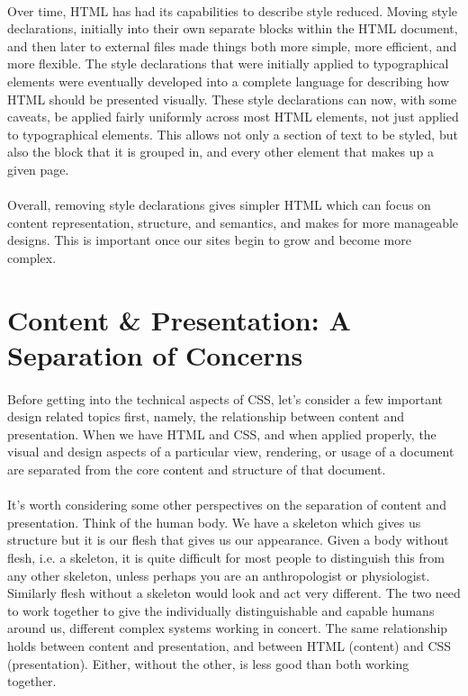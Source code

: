 \paragraph{} Over time, HTML has had its capabilities to describe style reduced. Moving style declarations, initially into their own separate blocks within the HTML document, and then later to external files made things both more simple, more efficient, and more flexible. The style declarations that were initially applied to typographical elements were eventually developed into a complete language for describing how HTML should be presented visually. These style declarations can now, with some caveats, be applied fairly uniformly across most HTML elements, not just applied to typographical elements. This allows not only a section of text to be styled, but also the block that it is grouped in, and every other element that makes up a given page.
\paragraph{} Overall, removing style declarations gives simpler HTML which can focus on content representation, structure, and semantics, and makes for more manageable designs. This is important once our sites begin to grow and become more complex.


\section{Content \& Presentation: A Separation of Concerns}
\paragraph{} Before getting into the technical aspects of CSS, let's consider a few important design related topics first, namely, the relationship between content and presentation. When we have HTML and CSS, and when applied properly, the visual and design aspects of a particular view, rendering, or usage of a document are separated from the core content and structure of that document.
\paragraph{} It's worth considering some other perspectives on the separation of content and presentation. Think of the human body. We have a skeleton which gives us structure but it is our flesh that gives us our appearance. Given a body without flesh, i.e. a skeleton, it is quite difficult for most people to distinguish this from any other skeleton, unless perhaps you are an anthropologist or physiologist. Similarly flesh without a skeleton would look and act very different. The two need to work together to give the individually distinguishable and capable humans around us, different complex systems working in concert. The same relationship holds between content and presentation, and between HTML (content) and CSS (presentation). Either, without the other, is less good than both working together.
